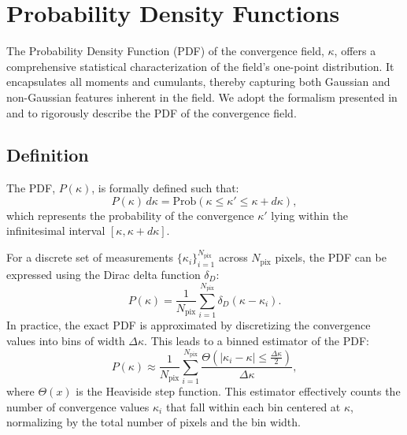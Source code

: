 \section{Probability Density Functions}
\label{sec:pdfs}
The Probability Density Function (PDF) of the convergence field, $\kappa$, offers a comprehensive statistical characterization of the field's one-point distribution. It encapsulates all moments and cumulants, thereby capturing both Gaussian and non-Gaussian features inherent in the field.
We adopt the formalism presented in \citet{2021MNRAS.505.2886B} and \citet{2023OJAp....6E...1U} to rigorously describe the PDF of the convergence field.

\subsection{Definition}
The PDF, $P(\kappa)$, is formally defined such that:
\begin{equation}
    P(\kappa) \, d\kappa = \mathrm{Prob}(\kappa \leq \kappa' \leq \kappa + d\kappa),
\end{equation}
which represents the probability of the convergence $\kappa'$ lying within the infinitesimal interval $[\kappa, \kappa + d\kappa]$. 

For a discrete set of measurements $\{\kappa_i\}_{i=1}^{N_{\mathrm{pix}}}$ across $N_{\mathrm{pix}}$ pixels, the PDF can be expressed using the Dirac delta function $\delta_D$:
\begin{equation}
    P(\kappa) = \frac{1}{N_{\mathrm{pix}}} \sum_{i=1}^{N_{\mathrm{pix}}} \delta_D(\kappa - \kappa_i).
    \label{eq:pdf_delta}
\end{equation}
In practice, the exact PDF is approximated by discretizing the convergence values into bins of width $\Delta\kappa$. This leads to a binned estimator of the PDF:
\begin{equation}
    P(\kappa) \approx \frac{1}{N_{\mathrm{pix}}} \sum_{i=1}^{N_{\mathrm{pix}}} \frac{\Theta\left(\left|\kappa_i - \kappa\right| \leq \frac{\Delta\kappa}{2}\right)}{\Delta\kappa},
    \label{eq:pdf_binned}
\end{equation}
where $\Theta(x)$ is the Heaviside step function.
This estimator effectively counts the number of convergence values $\kappa_i$ that fall within each bin centered at $\kappa$, normalizing by the total number of pixels and the bin width.

